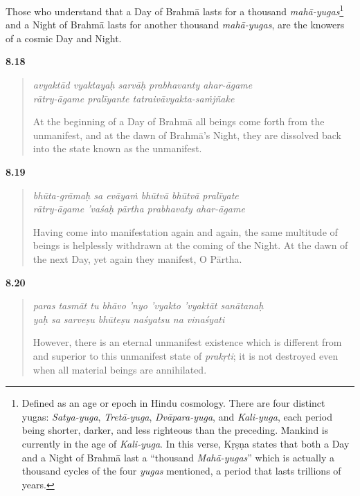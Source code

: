 {Those who understand that a Day of Brahmā lasts for a thousand \textit{mahā-yugas}\footnote{Defined as an age or epoch in Hindu cosmology. There are four distinct yugas: \textit{Satya-yuga}, \textit{Tretā-yuga}, \textit{Dvāpara-yuga}, and \textit{Kali-yuga}, each period being shorter, darker, and less righteous than the preceding. Mankind is currently in the age of \textit{Kali-yuga}. In this verse, Kṛṣṇa states that both a Day and a Night of Brahmā last a \enquote{thousand \textit{Mahā-yugas}} which is actually a thousand cycles of the four \textit{yugas} mentioned, a period that lasts trillions of years.} and a Night of Brahmā lasts for another thousand \textit{mahā-yugas}, are the knowers of a cosmic Day and Night.}


\par\noindent\textbf{8.18}\par
\begin{verse}
\textit{avyaktād vyaktayaḥ sarvāḥ prabhavanty ahar-āgame} \\
\textit{rātry-āgame pralīyante tatraivāvyakta-saṁjñake}

\noindent At the beginning of a Day of Brahmā all beings come forth from the unmanifest, and at the dawn of Brahmā's Night, they are dissolved back into the state known as the unmanifest.
\end{verse}
\par



\par\noindent\textbf{8.19}\par
\begin{verse}
\textit{bhūta-grāmaḥ sa evāyaṁ bhūtvā bhūtvā pralīyate} \\
\textit{rātry-āgame ’vaśaḥ pārtha prabhavaty ahar-āgame}

\noindent Having come into manifestation again and again, the same multitude of beings is helplessly withdrawn at the coming of the Night. At the dawn of the next Day, yet again they manifest, O Pārtha.
\end{verse}
\par



\par\noindent\textbf{8.20}\par
\begin{verse}
\textit{paras tasmāt tu bhāvo ’nyo ’vyakto ’vyaktāt sanātanaḥ} \\
\textit{yaḥ sa sarveṣu bhūteṣu naśyatsu na vinaśyati}

\noindent However, there is an eternal unmanifest existence which is different from and superior to this unmanifest state of \textit{prakṛti}; it is not destroyed even when all material beings are annihilated.
\end{verse}
\par



